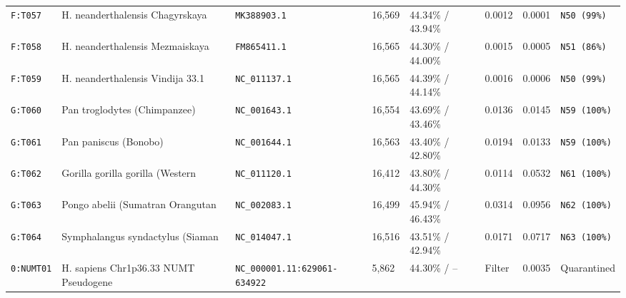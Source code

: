 \documentclass[10pt,letterpaper]{article}
\begin{document}
\begin{longtable}{llllllll}
\texttt{F:T057} & H. neanderthalensis Chagyrskaya  & \texttt{MK388903.1} & 16,569 & 44.34\% / 43.94\% & 0.0012 & 0.0001 & \texttt{N50 (99\%)} \\
\texttt{F:T058} & H. neanderthalensis Mezmaiskaya  & \texttt{FM865411.1} & 16,565 & 44.30\% / 44.00\% & 0.0015 & 0.0005 & \texttt{N51 (86\%)} \\
\texttt{F:T059} & H. neanderthalensis Vindija 33.1 & \texttt{NC\_011137.1} & 16,565 & 44.39\% / 44.14\% & 0.0016 & 0.0006 & \texttt{N50 (99\%)} \\
\texttt{G:T060} & Pan troglodytes (Chimpanzee) & \texttt{NC\_001643.1} & 16,554 & 43.69\% / 43.46\% & 0.0136 & 0.0145 & \texttt{N59 (100\%)} \\
\texttt{G:T061} & Pan paniscus (Bonobo) & \texttt{NC\_001644.1} & 16,563 & 43.40\% / 42.80\% & 0.0194 & 0.0133 & \texttt{N59 (100\%)} \\
\texttt{G:T062} & Gorilla gorilla gorilla (Western & \texttt{NC\_011120.1} & 16,412 & 43.80\% / 44.30\% & 0.0114 & 0.0532 & \texttt{N61 (100\%)} \\
\texttt{G:T063} & Pongo abelii (Sumatran Orangutan & \texttt{NC\_002083.1} & 16,499 & 45.94\% / 46.43\% & 0.0314 & 0.0956 & \texttt{N62 (100\%)} \\
\texttt{G:T064} & Symphalangus syndactylus (Siaman & \texttt{NC\_014047.1} & 16,516 & 43.51\% / 42.94\% & 0.0171 & 0.0717 & \texttt{N63 (100\%)} \\
\texttt{0:NUMT01} & H. sapiens Chr1p36.33 NUMT Pseudogene & \texttt{NC\_000001.11:629061-634922} & 5,862 & 44.30\% / -- & Filter & 0.0035 & Quarantined \\
\bottomrule
\end{longtable}
\end{document}
